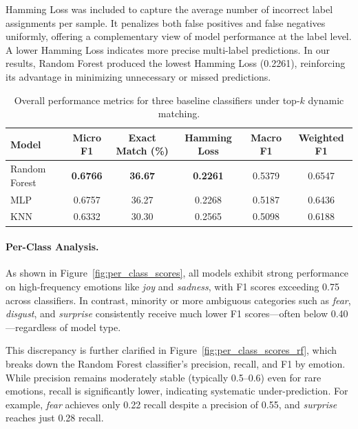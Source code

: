 \documentclass{article}
\begin{document}
Hamming Loss was included to capture the average number of incorrect label assignments per sample. It penalizes both false positives and false negatives uniformly, offering a complementary view of model performance at the label level. A lower Hamming Loss indicates more precise multi-label predictions. In our results, Random Forest produced the lowest Hamming Loss (0.2261), reinforcing its advantage in minimizing unnecessary or missed predictions.

\begin{table}[H]
\centering
\caption{Overall performance metrics for three baseline classifiers under top-$k$ dynamic matching.}
\label{tab:model_comparison}
\begin{tabular}{lccccc}
\toprule
\textbf{Model} & \textbf{Micro F1} & \textbf{Exact Match (\%)} & \textbf{Hamming Loss} & \textbf{Macro F1} & \textbf{Weighted F1} \\
\midrule
Random Forest     & \textbf{0.6766} & \textbf{36.67} & \textbf{0.2261} & 0.5379 & 0.6547 \\
MLP               & 0.6757          & 36.27          & 0.2268          & 0.5187 & 0.6436 \\
KNN               & 0.6332          & 30.30          & 0.2565          & 0.5098 & 0.6188 \\
\bottomrule
\end{tabular}
\end{table}

\paragraph{Per-Class Analysis.}

As shown in Figure~\ref{fig:per_class_scores}, all models exhibit strong performance on high-frequency emotions like \textit{joy} and \textit{sadness}, with F1 scores exceeding 0.75 across classifiers. In contrast, minority or more ambiguous categories such as \textit{fear}, \textit{disgust}, and \textit{surprise} consistently receive much lower F1 scores—often below 0.40—regardless of model type.

This discrepancy is further clarified in Figure~\ref{fig:per_class_scores_rf}, which breaks down the Random Forest classifier’s precision, recall, and F1 by emotion. While precision remains moderately stable (typically 0.5–0.6) even for rare emotions, recall is significantly lower, indicating systematic under-prediction. For example, \textit{fear} achieves only 0.22 recall despite a precision of 0.55, and \textit{surprise} reaches just 0.28 recall.
\end{document}
